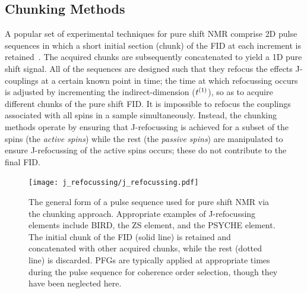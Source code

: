 \subsection{Chunking Methods}
A popular set of experimental techniques for pure shift \ac{NMR} comprise
\ac{2D} pulse sequences in which a short initial section (chunk) of the
\ac{FID} at each increment is retained~\cite{Adams2014}. The acquired chunks are
subsequently concatenated to yield a \ac{1D} pure shift signal.  All of the
sequences are designed such that they refocus the effects J-couplings at a
certain known point in time;
the time at which refocussing occurs is adjusted by incrementing
the indirect-dimension ($t^{(1)}$), so as to acquire
different chunks of the pure shift \ac{FID}. It is impossible to refocus the
couplings associated with all spins in a sample simultaneously. Instead, the
chunking methods operate by ensuring that J-refocussing is achieved for a
subset of the spins (the \emph{active spins}) while the rest (the \emph{passive
spins}) are manipulated to ensure J-refocussing of the active spins occurs;
these do not contribute to the final \ac{FID}.

\begin{figure}
    \centering
    \texttt{[image: j\_refocussing/j\_refocussing.pdf]}
    \caption[
        The general form of a pulse sequence used for pure shift \acs{NMR}
        using the chunking approach.
    ]{
        The general form of a pulse sequence used for pure shift \acs{NMR}
        via the chunking approach. Appropriate examples of J-refocussing
        elements include \acs{BIRD}, the \acl{ZS} element, and the
        \acs{PSYCHE} element. The initial chunk of the \ac{FID} (solid
        line) is retained and concatenated with other acquired chunks,
        while the rest (dotted line) is discarded. \acsp{PFG} are typically
        applied at appropriate times during the pulse sequence for coherence
        order selection, though they have been neglected here.
    }
    \label{fig:j-refocussing}
\end{figure}
\makeatletter
{}
\makeatother

